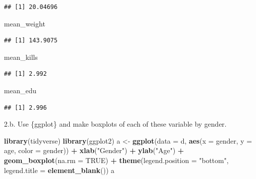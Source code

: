 \documentclass[]{article}
\newenvironment{Shaded}{\begin{snugshade}}{\end{snugshade}}
\newcommand{\KeywordTok}[1]{\textcolor[rgb]{0.13,0.29,0.53}{\textbf{#1}}}
\newcommand{\DataTypeTok}[1]{\textcolor[rgb]{0.13,0.29,0.53}{#1}}
\newcommand{\StringTok}[1]{\textcolor[rgb]{0.31,0.60,0.02}{#1}}
\newcommand{\OtherTok}[1]{\textcolor[rgb]{0.56,0.35,0.01}{#1}}
\newcommand{\OperatorTok}[1]{\textcolor[rgb]{0.81,0.36,0.00}{\textbf{#1}}}
\newcommand{\NormalTok}[1]{#1}
\begin{document}
\begin{verbatim}
## [1] 20.04696
\end{verbatim}

\begin{Shaded}
\begin{Highlighting}[]
\NormalTok{mean_weight}
\end{Highlighting}
\end{Shaded}

\begin{verbatim}
## [1] 143.9075
\end{verbatim}

\begin{Shaded}
\begin{Highlighting}[]
\NormalTok{mean_kills}
\end{Highlighting}
\end{Shaded}

\begin{verbatim}
## [1] 2.992
\end{verbatim}

\begin{Shaded}
\begin{Highlighting}[]
\NormalTok{mean_edu}
\end{Highlighting}
\end{Shaded}

\begin{verbatim}
## [1] 2.996
\end{verbatim}

2.b. Use \{ggplot\} and make boxplots of each of these variable by
gender.

\begin{Shaded}
\begin{Highlighting}[]
\KeywordTok{library}\NormalTok{(tidyverse)}
\KeywordTok{library}\NormalTok{(ggplot2)}
\NormalTok{a <-}\StringTok{ }\KeywordTok{ggplot}\NormalTok{(}\DataTypeTok{data =}\NormalTok{ d, }\KeywordTok{aes}\NormalTok{(}\DataTypeTok{x =}\NormalTok{ gender, }\DataTypeTok{y =}\NormalTok{ age, }\DataTypeTok{color =}\NormalTok{ gender)) }\OperatorTok{+}\StringTok{ }\KeywordTok{xlab}\NormalTok{(}\StringTok{"Gender"}\NormalTok{) }\OperatorTok{+}\StringTok{ }\KeywordTok{ylab}\NormalTok{(}\StringTok{"Age"}\NormalTok{) }\OperatorTok{+}\StringTok{ }\KeywordTok{geom_boxplot}\NormalTok{(}\DataTypeTok{na.rm =} \OtherTok{TRUE}\NormalTok{) }\OperatorTok{+}\StringTok{ }\KeywordTok{theme}\NormalTok{(}\DataTypeTok{legend.position =} \StringTok{"bottom"}\NormalTok{, }\DataTypeTok{legend.title =} \KeywordTok{element_blank}\NormalTok{())}
\NormalTok{a}
\end{Highlighting}
\end{Shaded}
\end{document}
